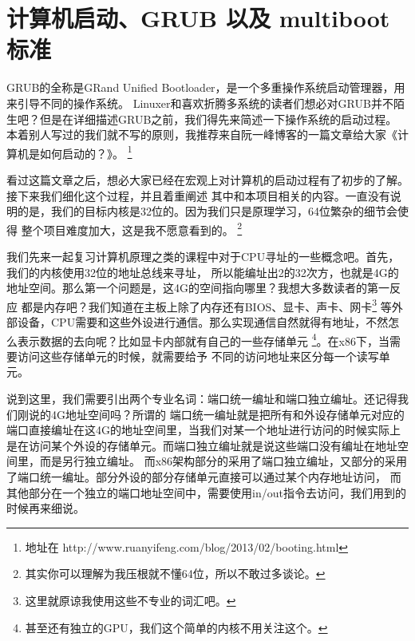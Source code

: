
\section {计算机启动、GRUB 以及 multiboot 标准}

\par GRUB的全称是GRand Unified Bootloader，是一个多重操作系统启动管理器，用来引导不同的操作系统。\allowbreak
Linuxer和喜欢折腾多系统的读者们想必对GRUB并不陌生吧？但是在详细描述GRUB之前，我们得先来简述一下操作系统的启动过程。\allowbreak
本着别人写过的我们就不写的原则，我推荐来自阮一峰博客的一篇文章给大家《计算机是如何启动的？》。
\footnote{地址在 http://www.ruanyifeng.com/blog/2013/02/booting.html}

\par 看过这篇文章之后，想必大家已经在宏观上对计算机的启动过程有了初步的了解。接下来我们细化这个过程，并且着重阐述\allowbreak
其中和本项目相关的内容。一直没有说明的是，我们的目标内核是32位的。因为我们只是原理学习，64位繁杂的细节会使得\allowbreak
整个项目难度加大，这是我不愿意看到的。
\footnote{其实你可以理解为我压根就不懂64位，所以不敢过多谈论。}

\par 我们先来一起复习计算机原理之类的课程中对于CPU寻址的一些概念吧。首先，我们的内核使用32位的地址总线来寻址，\allowbreak
所以能编址出2的32次方，也就是4G的地址空间。那么第一个问题是，这4G的空间指向哪里？我想大多数读者的第一反应\allowbreak
都是内存吧？我们知道在主板上除了内存还有BIOS、显卡、声卡、网卡\footnote{这里就原谅我使用这些不专业的词汇吧。}\allowbreak
等外部设备，CPU需要和这些外设进行通信。那么实现通信自然就得有地址，不然怎么表示数据的去向呢？比如显卡内部就有自己的一些存储单元\allowbreak
\footnote{甚至还有独立的GPU，我们这个简单的内核不用关注这个。}。在x86下，当需要访问这些存储单元的时候，就需要给予\allowbreak
不同的访问地址来区分每一个读写单元。

\par 说到这里，我们需要引出两个专业名词：端口统一编址和端口独立编址。还记得我们刚说的4G地址空间吗？所谓的\allowbreak
端口统一编址就是把所有和外设存储单元对应的端口直接编址在这4G的地址空间里，当我们对某一个地址进行访问的时候实际上\allowbreak
是在访问某个外设的存储单元。而端口独立编址就是说这些端口没有编址在地址空间里，而是另行独立编址。\allowbreak
而x86架构部分的采用了端口独立编址，又部分的采用了端口统一编址。部分外设的部分存储单元直接可以通过某个内存地址访问，\allowbreak
而其他部分在一个独立的端口地址空间中，需要使用in/out指令去访问，我们用到的时候再来细说。

